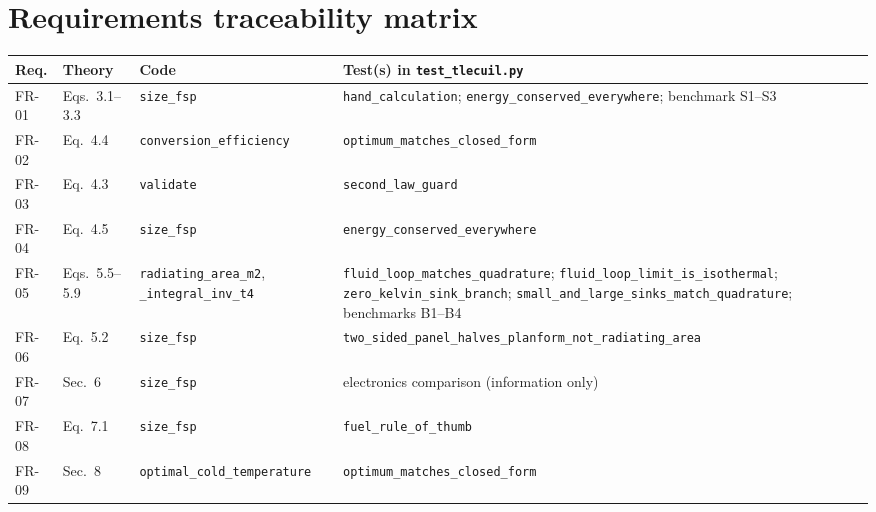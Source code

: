 \documentclass[11pt]{article}
\begin{document}
\section{Requirements traceability matrix}\label{sec:rtm}
{\small\begin{longtable}{>{\ttfamily}p{}p{}p{}p{}}
\toprule
Req. & Theory & Code & Test(s) in \texttt{test\_\allowbreak{}tlecuil.py} \\
\midrule
\endhead
FR-01 & Eqs.~3.1--3.3 & \texttt{size\_\allowbreak{}fsp} & \texttt{hand\_\allowbreak{}calculation}; \texttt{energy\_\allowbreak{}conserved\_\allowbreak{}everywhere}; benchmark S1--S3 \\
FR-02 & Eq.~4.4 & \texttt{conversion\_\allowbreak{}efficiency} & \texttt{optimum\_\allowbreak{}matches\_\allowbreak{}closed\_\allowbreak{}form} \\
FR-03 & Eq.~4.3 & \texttt{validate} & \texttt{second\_\allowbreak{}law\_\allowbreak{}guard} \\
FR-04 & Eq.~4.5 & \texttt{size\_\allowbreak{}fsp} & \texttt{energy\_\allowbreak{}conserved\_\allowbreak{}everywhere} \\
FR-05 & Eqs.~5.5--5.9 & \texttt{radiating\_\allowbreak{}area\_\allowbreak{}m2}, \texttt{\_\allowbreak{}integral\_\allowbreak{}inv\_\allowbreak{}t4} & \texttt{fluid\_\allowbreak{}loop\_\allowbreak{}matches\_\allowbreak{}quadrature}; \texttt{fluid\_\allowbreak{}loop\_\allowbreak{}limit\_\allowbreak{}is\_\allowbreak{}isothermal}; \texttt{zero\_\allowbreak{}kelvin\_\allowbreak{}sink\_\allowbreak{}branch}; \texttt{small\_\allowbreak{}and\_\allowbreak{}large\_\allowbreak{}sinks\_\allowbreak{}match\_\allowbreak{}quadrature}; benchmarks B1--B4 \\
FR-06 & Eq.~5.2 & \texttt{size\_\allowbreak{}fsp} & \texttt{two\_\allowbreak{}sided\_\allowbreak{}panel\_\allowbreak{}halves\_\allowbreak{}planform\_\allowbreak{}not\_\allowbreak{}radiating\_\allowbreak{}area} \\
FR-07 & Sec.~6 & \texttt{size\_\allowbreak{}fsp} & electronics comparison (information only) \\
FR-08 & Eq.~7.1 & \texttt{size\_\allowbreak{}fsp} & \texttt{fuel\_\allowbreak{}rule\_\allowbreak{}of\_\allowbreak{}thumb} \\
FR-09 & Sec.~8 & \texttt{optimal\_\allowbreak{}cold\_\allowbreak{}temperature} & \texttt{optimum\_\allowbreak{}matches\_\allowbreak{}closed\_\allowbreak{}form} \\

\end{longtable}}
\end{document}
